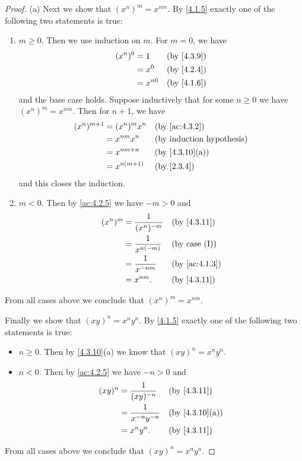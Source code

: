 \begin{proof}{(a)}
  Next we show that \((x^n)^m = x^{nm}\).
  By \cref{4.1.5} exactly one of the following two statements is true:
  \begin{enumerate}[label=(\Roman*)]
    \item \(m \geq 0\).
          Then we use induction on \(m\).
          For \(m = 0\), we have
          \begin{align*}
            (x^n)^0 & = 1      &  & \by{4.3.9} \\
                    & = x^0    &  & \by{4.2.4} \\
                    & = x^{n0} &  & \by{4.1.6}
          \end{align*}
          and the base case holds.
          Suppose inductively that for some \(n \geq 0\) we have \((x^n)^m = x^{nm}\).
          Then for \(n + 1\), we have
          \begin{align*}
            (x^n)^{m + 1} & = (x^n)^m x^n  &  & \text{(by \cref{ac:4.3.2})}  \\
                          & = x^{nm} x^n   &  & \byIH                        \\
                          & = x^{nm + n}   &  & \text{(by \cref{4.3.10}(a))} \\
                          & = x^{n(m + 1)} &  & \by{2.3.4}
          \end{align*}
          and this closes the induction.
    \item \(m < 0\).
          Then by \cref{ac:4.2.5} we have \(-m > 0\) and
          \begin{align*}
            (x^n)^m & = \dfrac{1}{(x^n)^{-m}} &  & \text{(by \cref{4.3.11})}   \\
                    & = \dfrac{1}{x^{n(-m)}}  &  & \text{(by case (I))}        \\
                    & = \dfrac{1}{x^{-nm}}    &  & \text{(by \cref{ac:4.1.3})} \\
                    & = x^{nm}.               &  & \text{(by \cref{4.3.11})}
          \end{align*}
  \end{enumerate}
  From all cases above we conclude that \((x^n)^m = x^{nm}\).

  Finally we show that \((xy)^n = x^n y^n\).
  By \cref{4.1.5} exactly one of the following two statements is true:
  \begin{itemize}
    \item \(n \geq 0\).
          Then by \cref{4.3.10}(a) we know that \((xy)^n = x^n y^n\).
    \item \(n < 0\).
          Then by \cref{ac:4.2.5} we have \(-n > 0\) and
          \begin{align*}
            (xy)^n & = \dfrac{1}{(xy)^{-n}}     &  & \text{(by \cref{4.3.11})}    \\
                   & = \dfrac{1}{x^{-n} y^{-n}} &  & \text{(by \cref{4.3.10}(a))} \\
                   & = x^n y^n.                 &  & \text{(by \cref{4.3.11})}
          \end{align*}
  \end{itemize}
  From all cases above we conclude that \((xy)^n = x^n y^n\).
\end{proof}

